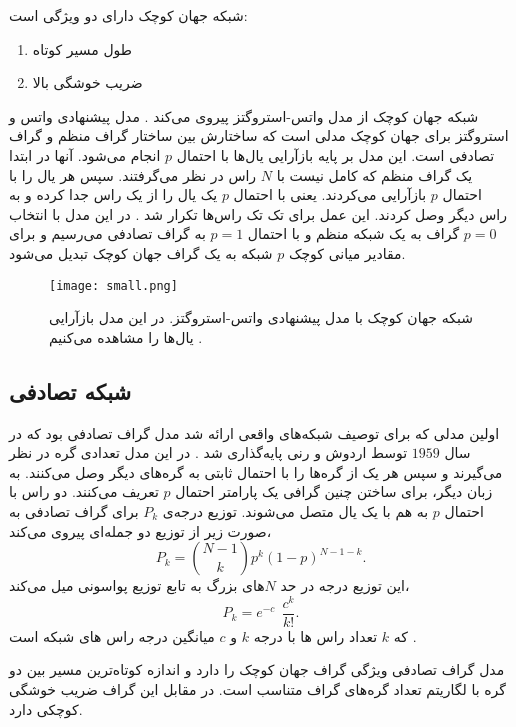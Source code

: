 شبکه جهان کوچک دارای دو ویژگی است:
\begin{enumerate}
\item طول مسیر کوتاه
\item ضریب خوشگی بالا
\end{enumerate}
شبکه جهان کوچک از مدل واتس-استروگتز پیروی می‌کند \cite{albert,watts}. مدل پیشنهادی واتس و استروگتز برای جهان کوچک مدلی است که ساختارش بین ساختار گراف منظم و گراف تصادفی است. این مدل بر پایه‌ بازآرایی یال‌ها با احتمال $p$ انجام می‌شود. آنها در ابتدا یک گراف منظم که کامل نیست با $N$ راس در نظر می‌گرفتند. سپس هر یال را با احتمال $p$ بازآرایی می‌کردند. یعنی با احتمال $p$ یک یال را از یک راس جدا کرده و به راس دیگر وصل کردند. این عمل برای تک تک راس‌ها تکرار شد \cite{watts,boc,albert}. در این مدل با انتخاب $p = 0$ گراف به یک شبکه منظم و با احتمال $p = 1$ به گراف تصادفی می‌رسیم و برای مقادیر میانی کوچک $p$ شبکه به یک گراف جهان کوچک تبدیل می‌شود.
\begin{figure} [htbp]
\centering
\texttt{[image: small.png]}
\caption[شبکه جهان کوچک با مدل پیشنهادی واتس-استروگتز] {\footnotesize شبکه جهان کوچک با مدل پیشنهادی واتس-استروگتز. در این مدل بازآرایی    یال‌ها را مشاهده می‌کنیم \cite{watts}.}
\label{fig:small}
\end{figure}
\subsection{شبکه تصادفی}
اولین مدلی که برای توصیف شبکه‌های واقعی ارائه شد مدل گراف تصادفی  بود که در سال $1959$ توسط اردوش و رنی پایه‌گذاری شد \cite{erdos}. در این مدل تعدادی گره در نظر می‌گیرند و سپس هر یک از گره‌ها را با احتمال ثابتی به گره‌های دیگر وصل می‌کنند. به زبان دیگر، برای ساختن چنین گرافی یک پارامتر احتمال $p$ تعریف می‌کنند. دو راس با احتمال $p$ به هم با یک یال متصل می‌شوند. 
توزیع درجه‌ی $P_{k}$ برای گراف تصادفی  به صورت زیر از توزیع دو جمله‌ای پیروی می‌کند،
\begin{equation}
P_{k} = \binom{N-1}{k}p^{k}(1-p)^{N-1-k}.
\end{equation}
 ‌این توزیع درجه در حد $N$های بزرگ به تابع توزیع پواسونی میل می‌کند،
\begin{equation}
P_{k} = e^{-c}~~\frac{c^{k}}{k!}. 
\end{equation}
که $k$ تعداد راس ها با درجه $k$ و  $c$ میانگین درجه راس های شبکه است \cite{new}.

مدل گراف تصادفی ویژگی گراف جهان کوچک را دارد و اندازه کوتاه‌ترین مسیر بین دو گره با لگاریتم تعداد گره‌های گراف متناسب است. در مقابل این گراف ضریب خوشگی کوچکی دارد.
